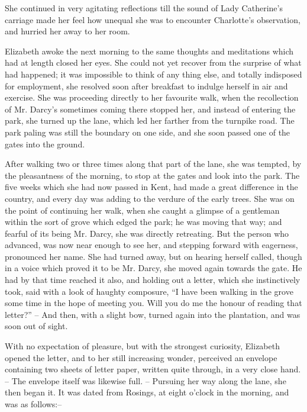 She continued in very agitating reflections till the sound
of Lady Catherine’s carriage made her feel how unequal
she was to encounter Charlotte’s observation, and hurried
her away to her room.


Elizabeth awoke the next morning to the same
thoughts and meditations which had at length closed her
eyes. She could not yet recover from the surprise of what
had happened; it was impossible to think of any thing
else, and totally indisposed for employment, she resolved
soon after breakfast to indulge herself in air and exercise.
She was proceeding directly to her favourite walk, when
the recollection of Mr. Darcy’s sometimes coming there
stopped her, and instead of entering the park, she turned
up the lane, which led her farther from the turnpike road.
The park paling was still the boundary on one side, and
she soon passed one of the gates into the ground.

After walking two or three times along that part of the
lane, she was tempted, by the pleasantness of the morning,
to stop at the gates and look into the park. The five
weeks which she had now passed in Kent, had made
a great difference in the country, and every day was adding
to the verdure of the early trees. She was on the point
of continuing her walk, when she caught a glimpse of
a gentleman within the sort of grove which edged the
park; he was moving that way; and fearful of its being
Mr. Darcy, she was directly retreating. But the person
who advanced, was now near enough to see her, and
stepping forward with eagerness, pronounced her name.
She had turned away, but on hearing herself called,
though in a voice which proved it to be Mr. Darcy, she
moved again towards the gate. He had by that time
reached it also, and holding out a letter, which she
instinctively took, said with a look of haughty composure,
“I have been walking in the grove some time in the hope
of meeting you. Will you do me the honour of reading
that letter?” -- And then, with a slight bow, turned again
into the plantation, and was soon out of sight.

With no expectation of pleasure, but with the strongest
curiosity, Elizabeth opened the letter, and to her still
increasing wonder, perceived an envelope containing two
sheets of letter paper, written quite through, in a very
close hand. -- The envelope itself was likewise full. --
Pursuing her way along the lane, she then began it. It
was dated from Rosings, at eight o’clock in the morning,
and was as follows:--

